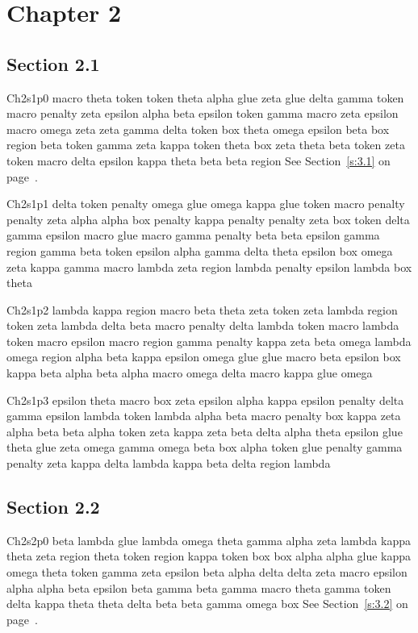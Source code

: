\chapter{Chapter 2}\label{ch:2}
\section{Section 2.1}\label{s:2.1}
Ch2s1p0 macro theta token token theta alpha glue zeta glue delta gamma token macro penalty zeta epsilon alpha beta epsilon token gamma macro zeta epsilon macro omega zeta zeta gamma delta token box theta omega epsilon beta box region beta token gamma zeta kappa token theta box zeta theta beta token zeta token macro delta epsilon kappa theta beta beta region See Section~\ref{s:3.1} on page~\pageref{s:3.1}.

Ch2s1p1 delta token penalty omega glue omega kappa glue token macro penalty penalty zeta alpha alpha box penalty kappa penalty penalty zeta box token delta gamma epsilon macro glue macro gamma penalty beta beta epsilon gamma region gamma beta token epsilon alpha gamma delta theta epsilon box omega zeta kappa gamma macro lambda zeta region lambda penalty epsilon lambda box theta

Ch2s1p2 lambda kappa region macro beta theta zeta token zeta lambda region token zeta lambda delta beta macro penalty delta lambda token macro lambda token macro epsilon macro region gamma penalty kappa zeta beta omega lambda omega region alpha beta kappa epsilon omega glue glue macro beta epsilon box kappa beta alpha beta alpha macro omega delta macro kappa glue omega

Ch2s1p3 epsilon theta macro box zeta epsilon alpha kappa epsilon penalty delta gamma epsilon lambda token lambda alpha beta macro penalty box kappa zeta alpha beta beta alpha token zeta kappa zeta beta delta alpha theta epsilon glue theta glue zeta omega gamma omega beta box alpha token glue penalty gamma penalty zeta kappa delta lambda kappa beta delta region lambda

\section{Section 2.2}\label{s:2.2}
Ch2s2p0 beta lambda glue lambda omega theta gamma alpha zeta lambda kappa theta zeta region theta token region kappa token box box alpha alpha glue kappa omega theta token gamma zeta epsilon beta alpha delta delta zeta macro epsilon alpha alpha beta epsilon beta gamma beta gamma macro theta gamma token delta kappa theta theta delta beta beta gamma omega box See Section~\ref{s:3.2} on page~\pageref{s:3.2}.

